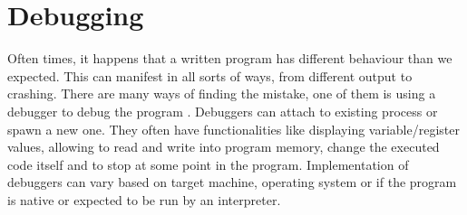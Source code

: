 \chapter{Debugging}
Often times, it happens that a written program has different behaviour than we expected. This can manifest in all sorts of ways, from different output to crashing. There are many ways of finding the mistake, one of them is using a debugger to debug the program \cite{software-debugging-testing-verification}.
Debuggers can attach to existing process or spawn a new one. They often have functionalities like displaying variable/register values, allowing to read and write into program memory, change the executed code itself and to stop at some point in the program. Implementation of debuggers can vary based on target machine, operating system or if the program is native or expected to be run by an interpreter.

